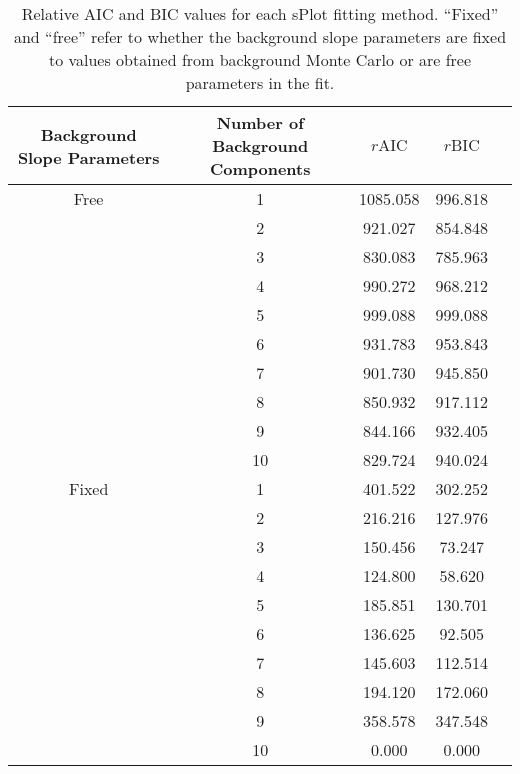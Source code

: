\begin{table}[ht]
    \begin{center}
        \begin{tabular}{ccccc}\toprule
        Background Slope Parameters & Number of Background Components & $r\text{AIC}$ & $r\text{BIC}$\\\midrule
        Free & 1 & 1085.058 & 996.818 \\
         & 2 & 921.027 & 854.848 \\
         & 3 & 830.083 & 785.963 \\
         & 4 & 990.272 & 968.212 \\
         & 5 & 999.088 & 999.088 \\
         & 6 & 931.783 & 953.843 \\
         & 7 & 901.730 & 945.850 \\
         & 8 & 850.932 & 917.112 \\
         & 9 & 844.166 & 932.405 \\
         & 10 & 829.724 & 940.024 \\
        Fixed & 1 & 401.522 & 302.252 \\
         & 2 & 216.216 & 127.976 \\
         & 3 & 150.456 & 73.247 \\
         & 4 & 124.800 & 58.620 \\
         & 5 & 185.851 & 130.701 \\
         & 6 & 136.625 & 92.505 \\
         & 7 & 145.603 & 112.514 \\
         & 8 & 194.120 & 172.060 \\
         & 9 & 358.578 & 347.548 \\
         & 10 & 0.000 & 0.000 \\\bottomrule
        \end{tabular}
        \caption{Relative AIC and BIC values for each sPlot fitting method. ``Fixed'' and ``free'' refer to whether the background slope parameters are fixed to values obtained from background Monte Carlo or are free parameters in the fit.}\label{tab:splot-model-results}
    \end{center}
\end{table}